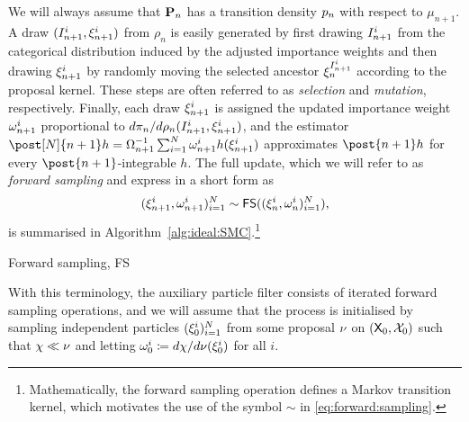 We will always assume that $\mathbf{P}_{n}$ has a transition density $p_{n}$ with respect to $\mu_{n + 1}$. A draw $(I_{n + 1}^{i}, \xi_{n + 1}^{i})$ from $\rho_n$ is easily generated by first drawing $I_{n + 1}^{i}$ from the categorical distribution induced by the adjusted importance weights and then drawing $\xi_{n + 1}^{i}$ by randomly moving the selected ancestor $\xi_{n}^{{I_{n + 1}^{i}}}$ according to the proposal kernel. These steps are often referred to as \emph{selection} and \emph{mutation}, respectively. 
Finally, each draw $\xi_{n + 1}^{i}$ is assigned the updated importance weight $\omega_{n + 1}^{i}$ proportional to $d \pi_n / d \rho_n (I_{n + 1}^{i}, \xi_{n + 1}^{i})$, and the estimator $\post[\N]{n + 1} h = \sumwght{n + 1}^{-1} \sum_{i = 1}^\N \ewght{n + 1}{i} h(\epart{n + 1}{i})$ approximates $\post{n + 1} h$ for every $\post{n + 1}$-integrable $h$. The full update, which we will refer to as \emph{forward sampling} and express in a short form as
\begin{equation} \label{eq:forward:sampling}
    (\epart{n + 1}{i}, \ewght{n + 1}{i})_{i = 1}^\N \sim \mathsf{FS}((\epart{n}{i}, \ewght{n}{i})_{i = 1}^\N),   
\end{equation}
is summarised in Algorithm~\ref{alg:ideal:SMC}.\footnote{Mathematically, the forward sampling operation defines a Markov transition kernel, which motivates the use of the symbol $\sim$ in \eqref{eq:forward:sampling}.} 

\begin{algorithm}[h] 
\caption{Forward sampling, \textsf{FS}} \label{alg:ideal:SMC}
\end{algorithm}

With this terminology, the auxiliary particle filter consists of iterated forward sampling operations, and we will assume that the process is initialised by sampling independent particles $(\xi_{0}^{i})_{i = 1}^N$ from some proposal $\nu$ on $(\mathsf{X}_0, \mathcal{X}_0)$ such that $\chi \ll \nu$ and letting $\omega_{0}^{i} \coloneqq d \chi / d \nu(\xi_{0}^{i})$ for all $i$. 


